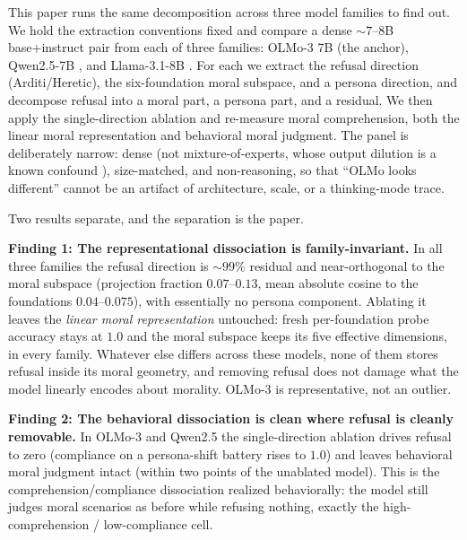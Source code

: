This paper runs the same decomposition across three model families to find out.
We hold the extraction conventions fixed and compare a dense \({\sim}7\)--8B
base+instruct pair from each of three families: OLMo-3 7B (the anchor),
Qwen2.5-7B \citep{qwen2025qwen25}, and Llama-3.1-8B \citep{grattafiori2024llama3}.
For each we extract the refusal direction (Arditi/Heretic), the six-foundation
moral subspace, and a persona direction, and decompose refusal into a moral part,
a persona part, and a residual. We then apply the single-direction ablation and
re-measure moral comprehension, both the linear moral representation and
behavioral moral judgment. The panel is deliberately narrow: dense (not
mixture-of-experts, whose output dilution is a known confound
\citep{reblitzrichardson2026dilution}), size-matched, and non-reasoning, so that
``OLMo looks different'' cannot be an artifact of architecture, scale, or a
thinking-mode trace.

Two results separate, and the separation is the paper.

\textbf{Finding 1: The representational dissociation is family-invariant.} In all
three families the refusal direction is \({\sim}99\%\) residual and
near-orthogonal to the moral subspace (projection fraction \(0.07\)--\(0.13\), mean
absolute cosine to the foundations \(0.04\)--\(0.075\)), with essentially no persona
component. Ablating it leaves the \emph{linear moral representation} untouched: fresh
per-foundation probe accuracy stays at \(1.0\) and the moral subspace keeps its
five effective dimensions, in every family. Whatever else differs across these
models, none of them stores refusal inside its moral geometry, and removing
refusal does not damage what the model linearly encodes about morality. OLMo-3 is
representative, not an outlier.

\textbf{Finding 2: The behavioral dissociation is clean where refusal is cleanly
removable.} In OLMo-3 and Qwen2.5 the single-direction ablation drives refusal to
zero (compliance on a persona-shift battery rises to \(1.0\)) and leaves behavioral
moral judgment intact (within two points of the unablated model). This is the
comprehension/compliance dissociation realized behaviorally: the model still
judges moral scenarios as before while refusing nothing, exactly the
high-comprehension / low-compliance cell.

